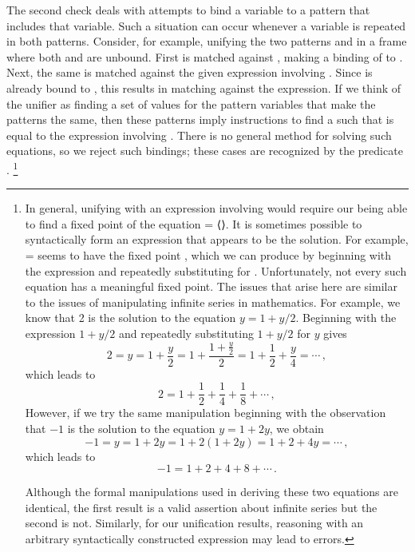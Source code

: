 The second check deals with attempts to bind a variable to a pattern that includes that variable.
Such a situation can occur whenever a variable is repeated in both patterns.
Consider, for example, unifying the two patterns  and  in a frame where both  and  are unbound.
First  is matched against , making a binding of  to .
Next, the same  is matched against the given expression involving .
Since  is already bound to , this results in matching  against the expression.
If we think of the unifier as finding a set of values for the pattern variables that make the patterns the same, then these patterns imply instructions to find a  such that  is equal to the expression involving .
There is no general method for solving such equations, so we reject such bindings;
these cases are recognized by the predicate .%
\footnote{
	In general, unifying  with an expression involving  would require our being able to find a fixed point of the equation  = ⟨⟩.
	It is sometimes possible to syntactically form an expression that appears to be the solution.
	For example,  =  seems to have the fixed point , which we can produce by beginning with the expression  and repeatedly substituting  for .
	Unfortunately, not every such equation has a meaningful fixed point.
	The issues that arise here are similar to the issues of manipulating infinite series in mathematics.
	For example, we know that 2 is the solution to the equation \( y = 1 + y / 2 \).
	Beginning with the expression \( 1 + y / 2 \) and repeatedly substituting \( 1 + y / 2 \) for \( y \) gives
	\[
		2
		= y
		= 1 + \frac{y}{2}
		= 1 + \frac{1 + \frac{y}{2}}{2}
		= 1 + \frac{1}{2} + \frac{y}{4}
		= \dotsb \,,
	\]
	which leads to
	\[
		2 = 1 + \frac{1}{2} + \frac{1}{4} + \frac{1}{8} + \dotsb \,,
	\]
	However, if we try the same manipulation beginning with the observation that \( -1 \) is the solution to the equation \( y = 1 + 2y \), we obtain
	\[
		-1
		= y
		= 1 + 2 y
		= 1 + 2 (1 + 2y)
		= 1 + 2 + 4 y
		= \dotsb \,,
	\]
	which leads to
	\[
		-1 = 1 + 2 + 4 + 8 + \dotsb \,.
	\]

	Although the formal manipulations used in deriving these two equations are identical, the first result is a valid assertion about infinite series but the second is not.
	Similarly, for our unification results, reasoning with an arbitrary syntactically constructed expression may lead to errors.
}
